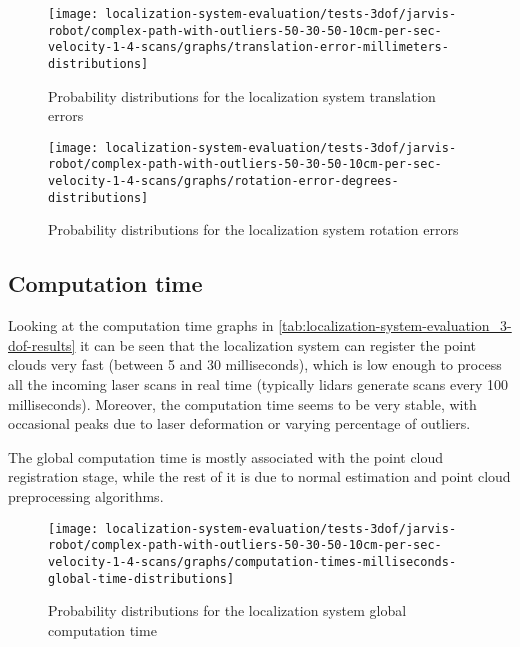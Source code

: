 \begin{figure}[H]
	\centering
	\begin{minipage}[H]{0.47\textwidth}
		\centering
		\texttt{[image: localization-system-evaluation/tests-3dof/jarvis-robot/complex-path-with-outliers-50-30-50-10cm-per-sec-velocity-1-4-scans/graphs/translation-error-millimeters-distributions]}
		\caption{Probability distributions for the localization system translation errors}
		\label{fig:localization-system-evaluation_complex-path-with-outliers-50-30-50-10cm-per-sec-velocity-1-4-translation-error}
	\end{minipage}\hfill
	\begin{minipage}[H]{0.47\textwidth}
		\centering
		\texttt{[image: localization-system-evaluation/tests-3dof/jarvis-robot/complex-path-with-outliers-50-30-50-10cm-per-sec-velocity-1-4-scans/graphs/rotation-error-degrees-distributions]}
		\caption{Probability distributions for the localization system rotation errors}
		\label{fig:localization-system-evaluation_complex-path-with-outliers-50-30-50-10cm-per-sec-velocity-1-4-rotation-error}
	\end{minipage}
\end{figure}



\subsection{Computation time}

Looking at the computation time graphs in \cref{tab:localization-system-evaluation_3-dof-results} it can be seen that the localization system can register the point clouds very fast (between 5 and 30 milliseconds), which is low enough to process all the incoming laser scans in real time (typically \glspl{lidar} generate scans every 100 milliseconds). Moreover, the computation time seems to be very stable, with occasional peaks due to laser deformation or varying percentage of outliers.

The global computation time is mostly associated with the point cloud registration stage, while the rest of it is due to normal estimation and point cloud preprocessing algorithms.

\begin{figure}[H]
	\centering
	\texttt{[image: localization-system-evaluation/tests-3dof/jarvis-robot/complex-path-with-outliers-50-30-50-10cm-per-sec-velocity-1-4-scans/graphs/computation-times-milliseconds-global-time-distributions]}
	\caption{Probability distributions for the localization system global computation time}
	\label{fig:localization-system-evaluation_complex-path-with-outliers-50-30-50-10cm-per-sec-velocity-1-4-scans-computation-time}
\end{figure}



